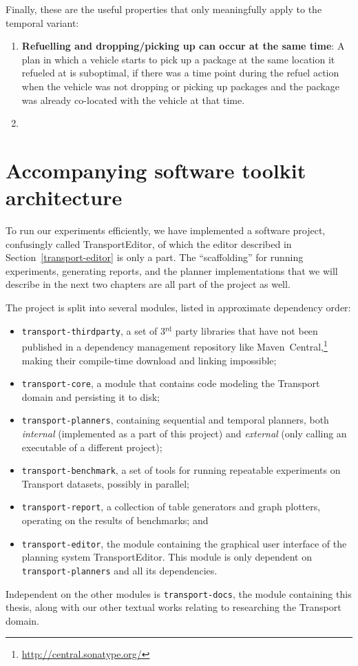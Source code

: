 Finally, these are the useful properties that only meaningfully apply to the temporal variant:
\begin{enumerate}
\item \textbf{Refuelling and dropping/picking up can occur at the same time}: 
A plan in which a vehicle starts to pick up a package at the same location it refueled at is suboptimal, if there was a time point during the refuel action
when the vehicle was not dropping or picking up packages and the package was already
co-located with the vehicle at that time.

\item \textbf{}
\end{enumerate}












\section{Accompanying software toolkit architecture}

To run our experiments efficiently, we have implemented a software project,
confusingly called TransportEditor, of which the editor described in
Section~\ref{transport-editor} is only a part.
The ``scaffolding'' for running experiments, generating reports, and the planner implementations that we will describe in the next two chapters are all part
of the project as well.

The project is split into several modules, listed in approximate dependency order:
\begin{itemize}
\item \texttt{transport-thirdparty}, a set of 3$^\textrm{rd}$ party libraries
that have not been published in a dependency management repository like Maven~Central,\footnote{\url{http://central.sonatype.org/}}
making their compile-time download and linking impossible;
\item \texttt{transport-core}, a module that contains code modeling the Transport
domain and persisting it to disk;
\item \texttt{transport-planners}, containing sequential and temporal planners, both \textit{internal} (implemented as a part of this project) and \textit{external}
(only calling an executable of a different project);
\item \texttt{transport-benchmark}, a set of tools for running repeatable
experiments on Transport datasets, possibly in parallel;
\item \texttt{transport-report}, a collection of table generators and graph plotters,
operating on the results of benchmarks; and
\item \texttt{transport-editor}, the module containing the graphical user interface
of the planning system TransportEditor. This module is only dependent
on \texttt{transport-planners} and all its dependencies.
\end{itemize}
Independent on the other modules is \texttt{transport-docs},
the module containing this thesis,
along with our other textual works relating to researching the Transport domain.

